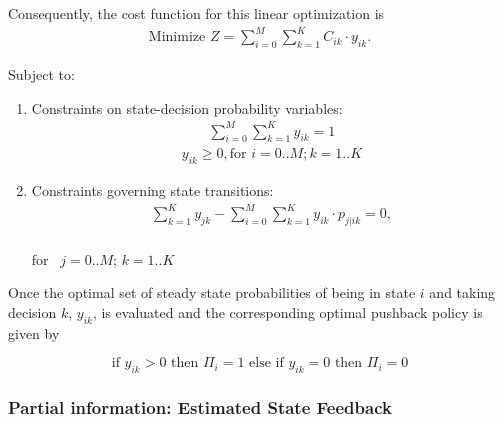 \documentclass[letterpaper]{article}
\begin{document}
Consequently, the cost function for this linear optimization is
 \begin{eqnarray}\label{e:costEquationFinal}
\mbox{Minimize } Z = \displaystyle\sum_{i=0}^M \displaystyle\sum_{k=1}^K
C_{ik}\cdot y_{ik}.
 \end{eqnarray}

Subject to:
\begin{enumerate}
\item Constraints on state-decision probability variables:
\begin{eqnarray} \label{e:stchastiVariableConstraints}
\displaystyle\sum_{i=0}^M \displaystyle\sum_{k=1}^K y_{ik} = 1  \end{eqnarray}
\begin{eqnarray} \label{e:stochasticVariableConstraints}
  y_{ik} \geq  0, \mbox{for } i = 0..M; k = 1..K \end{eqnarray}


\item Constraints governing state transitions:
\begin{eqnarray}\label{e:stateTransitionEq}
 \displaystyle\sum_{k=1}^K y_{jk} - \displaystyle\sum_{i=0}^M \displaystyle\sum_{k=1}^K y_{ik}\cdot p_{j|ik} = 0,
\end{eqnarray} \\
\mbox{for } $j = 0..M$; $k =1..K$

\end{enumerate}

Once the optimal set of steady state probabilities of being in state $i$ and taking decision $k$, $y_{ik}$, is evaluated and the corresponding 
optimal pushback policy is given by

\begin{equation}
\label{e:policyEvaluation}
\mbox{if } y_{ik} > 0 \mbox{ then } \Pi_{i} = 1
\mbox{ else if } y_{ik} = 0 \mbox{ then } \Pi_{i} = 0
\end{equation}


\subsubsection{Partial information: Estimated State Feedback} \label{partial}
\end{document}
